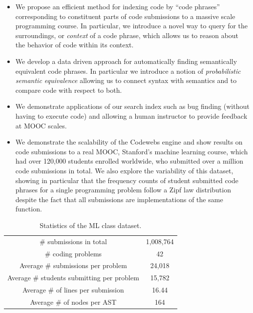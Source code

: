 \begin{itemize}
\item We propose an efficient method for indexing code by ``code phrases'' corresponding to constituent parts
of code submissions to a massive scale programming course.  In particular, we introduce a novel way to query for the surroundings, or \emph{context} of a code phrase, 
which allows us to reason about the behavior of code within its context.
\item We develop a data driven approach for automatically finding semantically equivalent code phrases.
In particular we introduce a notion of \emph{probabilistic semantic equivalence} allowing
us to connect syntax with semantics and to compare code with respect to both.
\item We demonstrate applications of our search index
such as bug finding (without having to execute code) and 
allowing a human instructor to  provide feedback at MOOC scales.
\item We demonstrate the scalability of the Codewebs engine and show results on code submissions to a real MOOC, Stanford's machine learning course,
which  had over 120,000 students enrolled worldwide, who submitted over a million code submissions in total.
We also explore the variability of this dataset, showing in particular that the frequency counts of  
student submitted code phrases for a single programming problem follow a Zipf law distribution despite the
fact that all submissions are implementations of the same function.
\end{itemize}
\begin{table}[t!]
\center
\begin{tabular}{|c|c|}
\hline
   \# submissions in total & 1,008,764 \\
   \# coding problems & 42 \\
    Average \# submissions per problem & 24,018 \\
    Average \# students submitting per problem & 15,782 \\
    Average \# of lines per submission  & 16.44 \\     %
    Average \# of nodes per AST & 164 \\
    \hline
\end{tabular}
\caption[Equivalence class dataset summary]{Statistics of the ML class dataset. }
\label{tab:datasetsummary}
\end{table}
